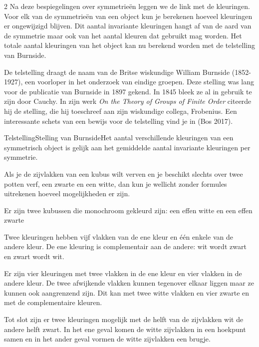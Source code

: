 \begin{multicols}{2}
Na deze bespiegelingen over symmetrieën leggen we de link met de kleuringen. Voor elk van de symmetrieën van een object kun je berekenen hoeveel kleuringen er ongewijzigd blijven. Dit aantal invariante kleuringen hangt af van de aard van de symmetrie maar ook van het aantal kleuren dat gebruikt mag worden. Het totale aantal kleuringen van het object kan nu berekend worden met de telstelling van Burnside.

De telstelling draagt de naam van de Britse wiskundige William Burnside (1852-1927), een voorloper in het onderzoek van eindige groepen. Deze stelling was lang voor de publicatie van Burnside in 1897 gekend. In 1845 bleek ze al in gebruik te zijn door Cauchy. In zijn werk \emph{On the Theory of Groups of Finite Order} citeerde hij de stelling, die hij toeschreef aan zijn wiskundige collega, Frobenius. Een interessante schets van een bewijs voor de telstelling vind je in (Bos 2017).

\begin{stellingkadertwee}
{Telstelling}{Stelling van Burnside}{Het aantal verschillende kleuringen van een symmetrisch object is gelijk aan het gemiddelde aantal invariante kleuringen per symmetrie.}
\end{stellingkadertwee}




Als je de zijvlakken van een kubus wilt verven en je beschikt slechts over twee potten verf, een zwarte en een witte, dan kun je wellicht zonder formules uitrekenen hoeveel mogelijkheden er zijn.

\begin{opsomming}
\item{Er zijn twee kubussen die monochroom gekleurd zijn: een effen witte en een effen zwarte}
\item{Twee kleuringen hebben vijf vlakken van de ene kleur en één enkele van de andere kleur. De ene kleuring is complementair aan de andere: wit wordt zwart en zwart wordt wit.}
\item{Er zijn vier kleuringen met twee vlakken in de ene kleur en vier vlakken in de andere kleur. De twee afwijkende vlakken kunnen tegenover elkaar liggen maar ze kunnen ook aangrenzend zijn. Dit kan met twee witte vlakken en vier zwarte en met de complementaire kleuren.}
\item{Tot slot zijn er twee kleuringen mogelijk met de helft van de zijvlakken wit de andere helft zwart. In het ene geval komen de witte zijvlakken in een hoekpunt samen en in het ander geval vormen de witte zijvlakken een brugje.}


\end{opsomming}
\end{multicols}
